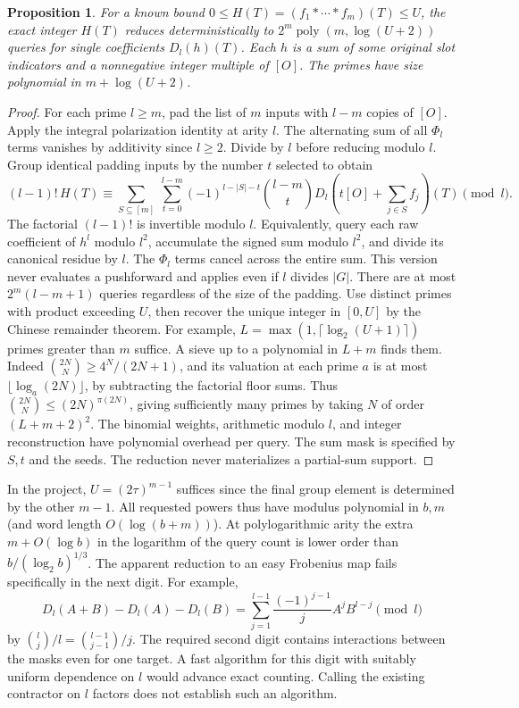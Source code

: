 \documentclass[11pt]{article}
\newtheorem{proposition}{Proposition}
\begin{document}
\begin{proposition}
For a known bound $0\le H(T)=(f_1*\cdots*f_m)(T)\le U$, the
exact integer $H(T)$ reduces deterministically to
$2^m\operatorname{poly}(m,\log(U+2))$ queries for single coefficients
$D_l(h)(T)$. Each $h$ is a sum of some original slot indicators and
a nonnegative integer multiple of $[O]$. The primes have size
polynomial in $m+\log(U+2)$.
\end{proposition}
\begin{proof}
For each prime $l\ge m$, pad the list of $m$ inputs with $l-m$
copies of $[O]$. Apply the integral polarization identity at arity
$l$. The alternating sum of all $\Phi_l$ terms vanishes by additivity
since $l\ge2$. Divide by $l$ before reducing modulo $l$.
Group identical padding inputs by the number $t$ selected to obtain
\[
 (l-1)!\, H(T)\equiv
 \sum_{S\subseteq[m]}\ \sum_{t=0}^{l-m}
 (-1)^{l-|S|-t}\binom{l-m}{t}
 D_l\left(t[O]+\sum_{j\in S} f_j\right)(T) \pmod l .
\]
The factorial $(l-1)!$ is invertible modulo $l$. Equivalently,
query each raw coefficient of $h^l$ modulo $l^2$, accumulate the
signed sum modulo $l^2$, and divide its canonical residue by $l$.
The $\Phi_l$ terms cancel across the entire sum. This version never
evaluates a pushforward and applies even if $l$ divides $|G|$.
There are at most $2^m(l-m+1)$ queries regardless of the size
of the padding. Use distinct primes with product exceeding $U$,
then recover the unique integer in $[0,U]$ by the Chinese remainder
theorem. For example, $L=\max(1,\lceil\log_2(U+1)\rceil)$ primes
greater than $m$ suffice. A sieve up to a polynomial in $L+m$ finds
them. Indeed $\binom{2N}{N}\ge 4^N/(2N+1)$, and its valuation at
each prime $a$ is at most $\lfloor\log_a(2N)\rfloor$, by subtracting
the factorial floor sums. Thus $\binom{2N}{N}\le(2N)^{\pi(2N)}$,
giving sufficiently many primes by taking $N$ of order $(L+m+2)^2$.
The binomial weights, arithmetic modulo $l$, and integer reconstruction
have polynomial overhead per query. The sum mask is specified by $S,t$
and the seeds. The reduction never materializes a partial-sum support.
\end{proof}

In the project, $U=(2\tau)^{m-1}$ suffices since the final group
element is determined by the other $m-1$. All requested powers thus
have modulus polynomial in $b,m$ (and word length $O(\log(b+m))$).
At polylogarithmic arity the extra $m+O(\log b)$ in the logarithm of
the query count is lower order than $b/(\log_2 b)^{1/3}$.
The apparent reduction to an easy Frobenius map fails specifically
in the next digit. For example,
\[
 D_l(A+B)-D_l(A)-D_l(B)
   =\sum_{j=1}^{l-1}\frac{(-1)^{j-1}}{j} A^j B^{l-j}\pmod l
\]
by $\binom{l}{j}/l=\binom{l-1}{j-1}/j$. The required second digit
contains interactions between the masks even for one target. A fast
algorithm for this digit with suitably uniform dependence on $l$
would advance exact counting. Calling the existing contractor on
$l$ factors does not establish such an algorithm.
\end{document}
